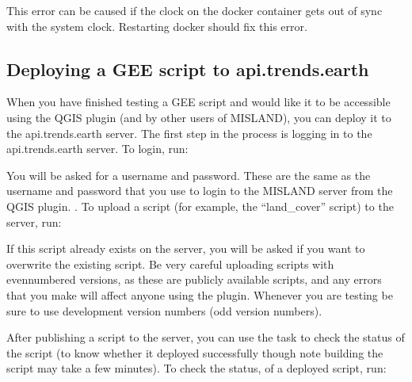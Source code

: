 \documentclass[letterpaper,10pt,english]{sphinxmanual}
\begin{document}
\sphinxAtStartPar
This error can be caused if the clock on the docker container gets out of sync
with the system clock. Restarting docker should fix this error.


\subsection{Deploying a GEE script to api.trends.earth}
\label{\detokenize{Qgis_Plugin/plugin_development:deploying-a-gee-script-to-api-trends-earth}}
\sphinxAtStartPar
When you have finished testing a GEE script and would like it to be accessible
using the QGIS plugin (and by other users of MISLAND), you can deploy it
to the api.trends.earth server. The first step in the process is logging in to
the api.trends.earth server. To login, run:

\begin{sphinxVerbatim}[commandchars=\\\{\}]
 
\end{sphinxVerbatim}

\sphinxAtStartPar
You will be asked for a username and password. These are the same as the
username and password that you use to login to the MISLAND server from the
QGIS plugin. . To upload a script (for example, the
“land\_cover” script) to the server, run:

\begin{sphinxVerbatim}[commandchars=\\\{\}]
   
\end{sphinxVerbatim}

\sphinxAtStartPar
If this script already exists on the server, you will be asked if you want to
overwrite the existing script. Be very careful uploading scripts with
even\sphinxhyphen{}numbered versions, as these are publicly available scripts, and any errors
that you make will affect anyone using the plugin. Whenever you are testing be
sure to use development version numbers (odd version numbers).

\sphinxAtStartPar
After publishing a script to the server, you can use the  task to
check the status of the script (to know whether it deployed successfully \sphinxhyphen{}
though note building the script may take a few minutes). To check the status,
of a deployed script, run:
\end{document}
